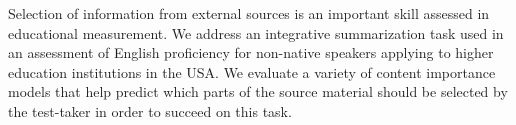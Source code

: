 Selection of information from external sources is an important skill assessed in educational measurement. We address an integrative summarization task used in an assessment of English proficiency for non-native speakers applying to higher education institutions in the USA. We evaluate a variety of content importance models that help predict which parts of the source material should be selected by the test-taker in order to succeed on this task.
